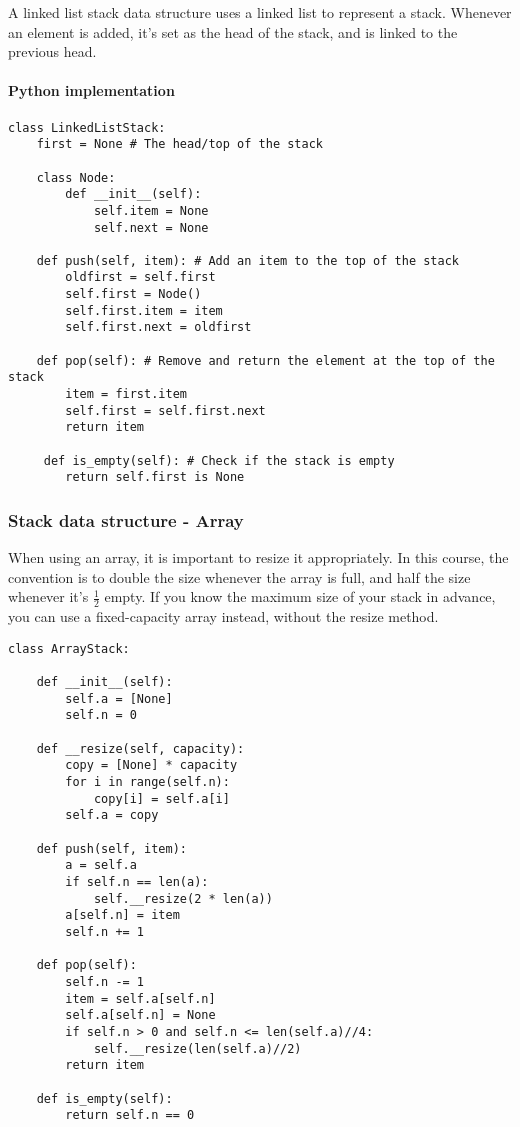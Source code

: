 \documentclass{article}
\begin{document}
A linked list stack data structure uses a linked list to represent a stack. Whenever an element is added, it's set as the head of the stack, and is linked to the previous head.

\paragraph{Python implementation}

\begin{verbatim}
class LinkedListStack:
    first = None # The head/top of the stack
    
    class Node:
        def __init__(self):
            self.item = None
            self.next = None

    def push(self, item): # Add an item to the top of the stack
        oldfirst = self.first
        self.first = Node()
        self.first.item = item
        self.first.next = oldfirst
            
    def pop(self): # Remove and return the element at the top of the stack
        item = first.item
        self.first = self.first.next
        return item

     def is_empty(self): # Check if the stack is empty
        return self.first is None
\end{verbatim}

\subsubsection{Stack data structure - Array}

When using an array, it is important to resize it appropriately. In this course, the convention is to double the size whenever the array is full, and half the size whenever it's $\frac {1} {2}$ empty. If you know the maximum size of your stack in advance, you can use a fixed-capacity array instead, without the resize method.

\begin{verbatim}
class ArrayStack:

    def __init__(self):
        self.a = [None]
        self.n = 0
        
    def __resize(self, capacity):
        copy = [None] * capacity
        for i in range(self.n):
            copy[i] = self.a[i]
        self.a = copy

    def push(self, item):
        a = self.a
        if self.n == len(a):
            self.__resize(2 * len(a))
        a[self.n] = item
        self.n += 1
        
    def pop(self):
        self.n -= 1
        item = self.a[self.n]
        self.a[self.n] = None
        if self.n > 0 and self.n <= len(self.a)//4: 
            self.__resize(len(self.a)//2)
        return item

    def is_empty(self):
        return self.n == 0
\end{verbatim}
\end{document}

